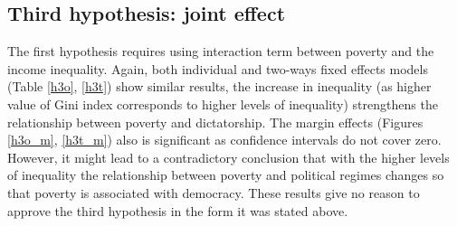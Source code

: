 \documentclass[a4paper, 12pt]{article}
\begin{document}
    \subsection{Third hypothesis: joint effect}
    
    The first hypothesis requires using interaction term between poverty and the income inequality. Again, both individual and two-ways fixed effects models (Table \ref{h3o}, \ref{h3t}) show similar results, the increase in inequality (as higher value of Gini index corresponds to higher levels of inequality) strengthens the relationship between poverty and dictatorship. The margin effects (Figures \ref{h3o_m}, \ref{h3t_m}) also is significant as confidence intervals do not cover zero. However, it might lead to a contradictory conclusion that with the higher levels of inequality the relationship between poverty and political regimes changes so that poverty is associated with democracy. These results give no reason to approve the third hypothesis in the form it was stated above.   
    
\end{document}
